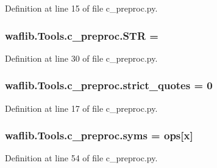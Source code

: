 Definition at line 15 of file c\+\_\+preproc.\+py.

\subsubsection[{\texorpdfstring{S\+TR}{STR}}]{ waflib.\+Tools.\+c\+\_\+preproc.\+S\+TR = \textquotesingle{}}\hypertarget{namespacewaflib_1_1_tools_1_1c__preproc_ab6cd0bcb53cadc1c276032cc6acf2c19}{}\label{namespacewaflib_1_1_tools_1_1c__preproc_ab6cd0bcb53cadc1c276032cc6acf2c19}


Definition at line 30 of file c\+\_\+preproc.\+py.

\subsubsection[{\texorpdfstring{strict\+\_\+quotes}{strict_quotes}}]{ waflib.\+Tools.\+c\+\_\+preproc.\+strict\+\_\+quotes = 0}\hypertarget{namespacewaflib_1_1_tools_1_1c__preproc_a1f10b9d6cbd8cd2e1a008d7f1f11890c}{}\label{namespacewaflib_1_1_tools_1_1c__preproc_a1f10b9d6cbd8cd2e1a008d7f1f11890c}


Definition at line 17 of file c\+\_\+preproc.\+py.

\subsubsection[{\texorpdfstring{syms}{syms}}]{\setlength{\rightskip}{0pt plus 5cm}waflib.\+Tools.\+c\+\_\+preproc.\+syms = ops\mbox{[}x\mbox{]}}\hypertarget{namespacewaflib_1_1_tools_1_1c__preproc_a771ecabf2f982f88eb9c1598847fd508}{}\label{namespacewaflib_1_1_tools_1_1c__preproc_a771ecabf2f982f88eb9c1598847fd508}


Definition at line 54 of file c\+\_\+preproc.\+py.

